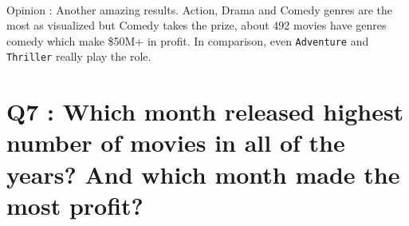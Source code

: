 \documentclass[11pt]{article}
\begin{document}
    \begin{center}
    \end{center}
    { \hspace*{\fill} \\}
    
    Opinion : Another amazing results. Action, Drama and Comedy genres are
the most as visualized but Comedy takes the prize, about 492 movies have
genres comedy which make \$50M+ in profit. In comparison, even
\texttt{Adventure} and \texttt{Thriller} really play the role.

    \section{Q7 : Which month released highest number of movies in all of
the years? And which month made the most
profit?}\label{q7-which-month-released-highest-number-of-movies-in-all-of-the-years-and-which-month-made-the-most-profit}
\end{document}
